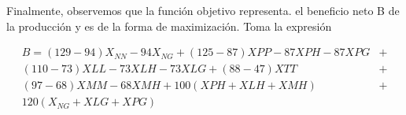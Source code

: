 \documentclass[../../main.tex]{subfiles}
\begin{document}
\begin{frame}

Finalmente, observemos que la función objetivo representa. el beneficio neto B de la producción y es de la forma de maximización. Toma la expresión




\begin{align*}
  B = (129 - 94)X_{NN} -94X_{NG} + (125 - 87)XPP - 87XPH -87XPG & +\\
  (110 - 73)XLL - 73XLH - 73XLG + (88 -47)XTT & + \\
  (97 - 68)XMM - 68XMH + 100(XPH + XLH + XMH) & + \\
  120(X_{NG} + XLG + XPG)  
\end{align*}

    \end{frame}
\end{document}

